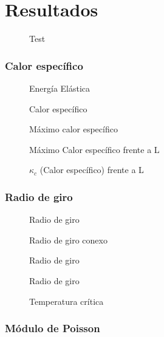 \chapter{Resultados}
\begin{figure}[h]
\centering
 
\caption{Test}
\end{figure}
\subsection{Calor específico}
\begin{figure}[h]
\centering
 
\caption{Energía Elástica}
\end{figure}

\begin{figure}[h]
  \centering
  
  \caption{Calor específico}
\end{figure}

\begin{figure}[h]
  \centering
  
  \caption{Máximo calor específico}
\end{figure}

\begin{figure}[h]
  \centering
  
  \caption{Máximo Calor específico frente a L}
\end{figure}

\begin{figure}[h]
  \centering
  
  \caption{$\kappa_c$ (Calor específico) frente a L}
\end{figure}
\clearpage
\subsection{Radio de giro}
\begin{figure}[h]
  \centering
  
  \caption{Radio de giro}
\end{figure}

\begin{figure}[h]
  \centering
  
  \caption{Radio de giro conexo}
\end{figure}

\begin{figure}[h]
  \centering
  
  \caption{Radio de giro}
\end{figure}

\begin{figure}[h]
  \centering
  
  \caption{Radio de giro}
\end{figure}

\begin{figure}[h]
  \centering
  
  \caption{Temperatura crítica}
\end{figure}
\clearpage
\subsection{Módulo de Poisson}

